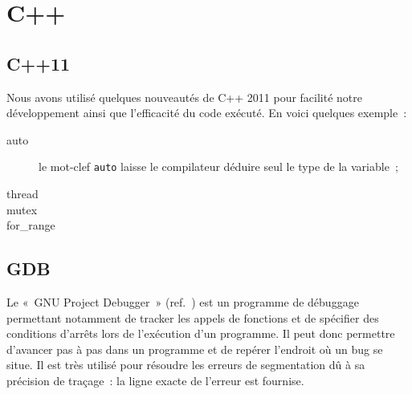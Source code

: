 \section{C++}

\subsection{C++11}
Nous avons utilisé quelques nouveautés de C++ 2011 pour facilité notre développement ainsi que l'efficacité du code exécuté. En voici quelques exemple~:
\begin{description}
\item[auto] le mot-clef \verb|auto| laisse le compilateur déduire seul le type de la variable~;
\item[thread]
\item[mutex]
\item[for\_range]
\end{description}

\subsection{GDB}
Le «~GNU Project Debugger~» (ref.~\cite{gdb}) est un programme de débuggage permettant notamment de tracker les appels de fonctions et de spécifier des conditions d'arrêts lors de l'exécution d'un programme. Il peut donc permettre d'avancer pas à pas dans un programme et de repérer l'endroit où un bug se situe. Il est très utilisé pour résoudre les erreurs de segmentation dû à sa précision de traçage~: la ligne exacte de l'erreur est fournise.
